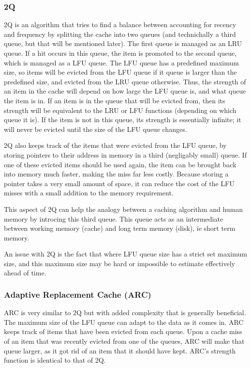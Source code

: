 \documentclass[10pt,letterpaper]{article}
\begin{document}
\subsubsection{2Q}

2Q is an algorithm that tries to find a balance between accounting for recency and frequency
by splitting the cache into two queues (and technichally a third queue, but that will be
mentioned later). The first queue is managed as an LRU queue. If a hit occurs
in this queue, the item is promoted to the second queue, which is managed as a LFU queue. The LFU 
queue has a predefined maximum size, so items will be evicted from the LFU queue if it queue is larger
than the predefined size, and evicted from the LRU queue otherwise. Thus, the strength of an item in the 
cache will depend on how large the LFU queue is, and what queue the item is in. If an item is in the queue that will
be evicted from, then its strength will be equivalent to the LRU or LFU functions (depending on which queue it is). If the item is
not in this queue, its strength is essentially infinite; it will never be evicted until the size of the LFU queue changes.

2Q also keeps track of the items that were evicted from the LFU queue, by storing
pointers to their address in memory in a third (negligably small) queue. If one of these evicted items should be used again,
the item can be brought back into memory much faster, making the miss far less costly. Because storing a
pointer takes a very small amount of space, it can reduce the cost of the LFU misses with a small
addition to the memory requirement.

This aspect of 2Q can help the analogy between a caching algorithm and human memory by introcing this third queue. 
This queue acts as an intermediate between working memory (cache) and long term memory (disk), ie 
short term memory.  

An issue with 2Q is the fact that where LFU queue size has a strict set maximum size, and this maximum size
may be hard or impossible to estimate effectively ahead of time. 

\subsubsection{Adaptive Replacement Cache (ARC)}

ARC is very similar to 2Q but with added complexity that is generally beneficial. The maximum size of
the LFU queue can adapt to the data as it comes in. ARC keeps track of items that
have been evicted from each queue. Upon a cache miss of an item that was recently evicted
from one of the queues, ARC will make that queue larger, as it got rid of an item that it should have kept. ARC's strength function is identical to that of 2Q.
\end{document}
